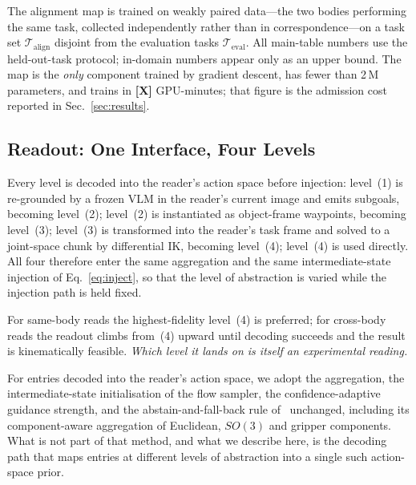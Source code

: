 \documentclass[letterpaper, 10 pt, conference]{ieeeconf}
\newcommand{\todo}[1]{\textbf{[#1]}}
\begin{document}
The alignment map is trained on weakly paired data---the two bodies performing
the same task, collected independently rather than in correspondence---on a task
set $\mathcal{T}_\mathrm{align}$ disjoint from the evaluation tasks
$\mathcal{T}_\mathrm{eval}$. All main-table numbers use the held-out-task
protocol; in-domain numbers appear only as an upper bound. The map is the
\emph{only} component trained by gradient descent, has fewer than 2\,M
parameters, and trains in \todo{X} GPU-minutes; that figure is the admission cost
reported in Sec.~\ref{sec:results}.

\subsection{Readout: One Interface, Four Levels}
\label{sec:method:readout}

Every level is decoded into the reader's action space before injection: level~(1)
is re-grounded by a frozen VLM in the reader's current image and emits subgoals,
becoming level~(2); level~(2) is instantiated as object-frame waypoints,
becoming level~(3); level~(3) is transformed into the reader's task frame and
solved to a joint-space chunk by differential IK, becoming level~(4); level~(4)
is used directly. All four therefore enter the same aggregation and the same
intermediate-state injection of Eq.~\eqref{eq:inject}, so that the level of
abstraction is varied while the injection path is held fixed.

For same-body reads the highest-fidelity level~(4) is preferred; for cross-body
reads the readout climbs from~(4) upward until decoding succeeds and the result
is kinematically feasible. \emph{Which level it lands on is itself an
experimental reading.}

For entries decoded into the reader's action space, we adopt the aggregation, the
intermediate-state initialisation of the flow sampler, the confidence-adaptive
guidance strength, and the abstain-and-fall-back rule of~\cite{rts} unchanged,
including its component-aware aggregation of Euclidean, $SO(3)$ and gripper
components. What is not part of that method, and what we describe here, is the
decoding path that maps entries at different levels of abstraction into a single
such action-space prior.
\end{document}
